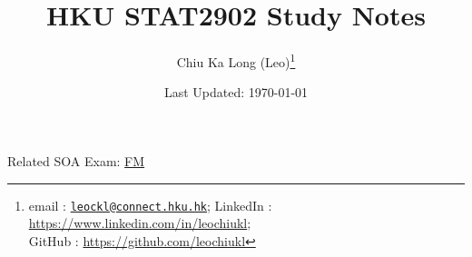 \documentclass{article}
\begin{document}
\title{HKU STAT2902 Study Notes}
\author{Chiu Ka Long (Leo)\thanks{email :
\href{mailto:leockl@connect.hku.hk}{\texttt{leockl@connect.hku.hk}};
LinkedIn :
\url{https://www.linkedin.com/in/leochiukl}; \\ GitHub :
\url{https://github.com/leochiukl}
}}
\date{Last Updated: \today}
\maketitle
\doclicenseThis
\nocite{*}
\begin{note}
Related SOA Exam:
\href{https://www.soa.org/education/exam-req/edu-exam-fm-detail.aspx}{FM}
\end{note}
\tableofcontents





\printbibliography

\end{document}
